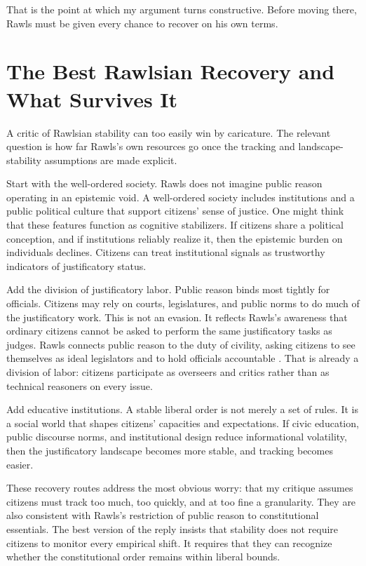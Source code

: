 \documentclass[12pt]{article}
\begin{document}
That is the point at which my argument turns constructive. Before moving there, Rawls must be given every chance to recover on his own terms.

\section{The Best Rawlsian Recovery and What Survives It}

A critic of Rawlsian stability can too easily win by caricature. The relevant question is how far Rawls's own resources go once the tracking and landscape-stability assumptions are made explicit.

Start with the well-ordered society. Rawls does not imagine public reason operating in an epistemic void. A well-ordered society includes institutions and a public political culture that support citizens' sense of justice. One might think that these features function as cognitive stabilizers. If citizens share a political conception, and if institutions reliably realize it, then the epistemic burden on individuals declines. Citizens can treat institutional signals as trustworthy indicators of justificatory status.

Add the division of justificatory labor. Public reason binds most tightly for officials. Citizens may rely on courts, legislatures, and public norms to do much of the justificatory work. This is not an evasion. It reflects Rawls's awareness that ordinary citizens cannot be asked to perform the same justificatory tasks as judges. Rawls connects public reason to the duty of civility, asking citizens to see themselves as ideal legislators and to hold officials accountable \parencite[p.~444]{rawls2005political}. That is already a division of labor: citizens participate as overseers and critics rather than as technical reasoners on every issue.

Add educative institutions. A stable liberal order is not merely a set of rules. It is a social world that shapes citizens' capacities and expectations. If civic education, public discourse norms, and institutional design reduce informational volatility, then the justificatory landscape becomes more stable, and tracking becomes easier.

These recovery routes address the most obvious worry: that my critique assumes citizens must track too much, too quickly, and at too fine a granularity. They are also consistent with Rawls's restriction of public reason to constitutional essentials. The best version of the reply insists that stability does not require citizens to monitor every empirical shift. It requires that they can recognize whether the constitutional order remains within liberal bounds.
\end{document}
